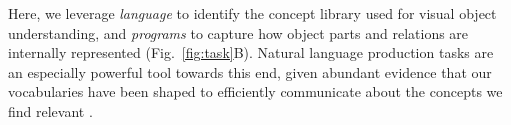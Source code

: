 \documentclass[10pt,letterpaper]{article}
\newcommand{\jda}[1]{{\color{blue}[jda: #1]}}
\begin{document}


Here, we leverage \textit{language} to identify the concept library used for visual object understanding, and \textit{programs} to capture how object parts and relations are internally represented (Fig.~\ref{fig:task}B).
Natural language production tasks are an especially powerful tool towards this end, given abundant evidence that our vocabularies have been shaped to efficiently communicate about the concepts we find relevant .
\end{document}
